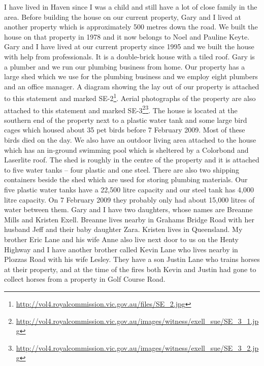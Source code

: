 \documentclass[a4paper]{article}
\begin{document}
    I have lived in Haven since I was a child and still have a lot of close family in the area. Before building the house on our current property, Gary and I lived at another property which is approximately 500 metres down the road. We built the house on that property in 1978 and it now belongs to Noel and Pauline Keyte.
    Gary and I have lived at our current property since 1995 and we built the house with help from professionals. It is a double-brick house with a tiled roof. Gary is a plumber and we run our plumbing business from home. Our property has a large shed which we use for the plumbing business and we employ eight plumbers and an office manager. A diagram showing the lay out of our property is attached to this statement and marked SE-2\footnote{\url{http://vol4.royalcommission.vic.gov.au/files/SE_2.jpg}}. Aerial photographs of the property are also attached to this statement and marked SE-3\footnote{\url{http://vol4.royalcommission.vic.gov.au/images/witness/exell_sue/SE_3_1.jpg}}\footnote{\url{http://vol4.royalcommission.vic.gov.au/images/witness/exell_sue/SE_3_2.jpg}}. The house is located at the southern end of the property next to a plastic water tank and some large bird cages which housed about 35 pet birds before 7 February 2009. Most of these birds died on the day. We also have an outdoor living area attached to the house which has an in-ground swimming pool which is sheltered by a Colorbond and Laserlite roof. The shed is roughly in the centre of the property and it is attached to five water tanks – four plastic and one steel. There are also two shipping containers beside the shed which are used for storing plumbing materials. Our five plastic water tanks have a 22,500 litre capacity and our steel tank has 4,000 litre capacity. On 7 February 2009 they probably only had about 15,000 litres of water between them.
    Gary and I have two daughters, whose names are Breanne Mills and Kristen Exell. Breanne lives nearby in Grahams Bridge Road with her husband Jeff and their baby daughter Zara. Kristen lives in Queensland. My brother Eric Lane and his wife Anne also live next door to us on the Henty Highway and I have another brother called Kevin Lane who lives nearby in Plozzas Road with his wife Lesley. They have a son Justin Lane who trains horses at their property, and at the time of the fires both Kevin and Justin had gone to collect horses from a property in Golf Course Road.
\end{document}
